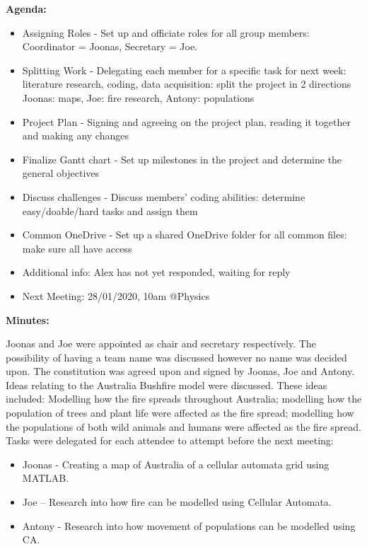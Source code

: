 \noindent\textbf{Agenda:}

\begin{itemize}
    \item  Assigning Roles - Set up and officiate roles for all group members: Coordinator = Joonas, Secretary = Joe.
	\item Splitting Work - Delegating each member for a specific task for next week: literature research, coding, data acquisition: split the project in 2 directions Joonas: maps, Joe: fire research, Antony: populations
	\item Project Plan - Signing and agreeing on the project plan, reading it together and making any changes
	\item Finalize Gantt chart - Set up milestones in the project and determine the general objectives 
	\item Discuss challenges - Discuss members’ coding abilities: determine easy/doable/hard tasks and assign them
	\item Common OneDrive - Set up a shared OneDrive folder for all common files: make sure all have access
	\item Additional info: Alex has not yet responded, waiting for reply
	\item Next Meeting: 28/01/2020, 10am @Physics
\end{itemize}
\clearpage
\noindent \textbf{Minutes:}

\noindent Joonas and Joe were appointed as chair and secretary respectively. The possibility of having a team name was discussed however no name was decided upon. The constitution was agreed upon and signed by Joonas, Joe and Antony. Ideas relating to the Australia Bushfire model were discussed. These ideas included: Modelling how the fire spreads throughout Australia; modelling how the population of trees and plant life were affected as the fire spread; modelling how the populations of both wild animals and humans were affected as the fire spread. Tasks were delegated for each attendee to attempt before the next meeting:  

\begin{itemize}
    \item Joonas - Creating a map of Australia of a cellular automata grid using MATLAB. 
    \item Joe – Research into how fire can be modelled using Cellular Automata. 
    \item Antony - Research into how movement of populations can be modelled using CA. 
\end{itemize}

